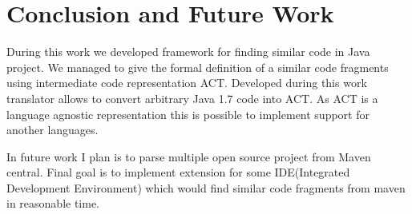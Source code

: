 \section{Conclusion and Future Work}

During this work we developed framework for finding similar code in Java project.
We  managed to give the formal definition of a similar code fragments using intermediate code representation ACT.
Developed during this work translator allows to convert arbitrary Java 1.7 code into ACT.
As ACT is a language agnostic representation this is possible to implement support for another languages.

In future work I plan is to parse multiple open source project from Maven central.
Final goal is to implement extension for some IDE(Integrated Development Environment) which would find similar code
fragments from maven in reasonable time.
